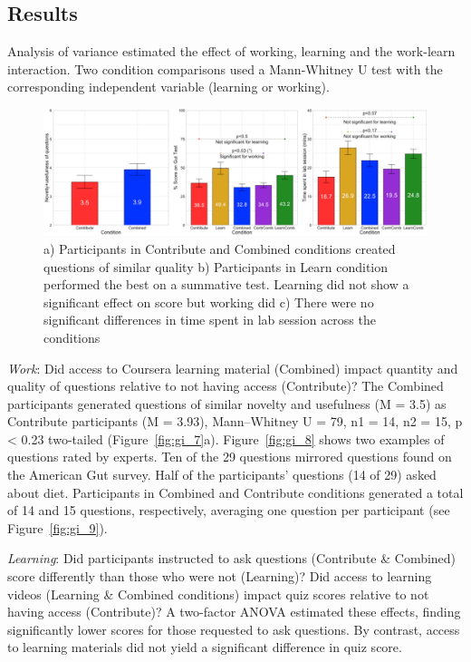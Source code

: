 \subsection*{Results}
Analysis of variance estimated the effect of working, learning and the work-learn interaction. Two condition comparisons used a Mann-Whitney U test with the corresponding independent variable (learning or working). 

\begin{figure}[h] 
  \centering
  \includegraphics[width=1.0\textwidth]{figures/gutinstinct/gi-7.png}
  \caption[Results: Question quality, Learning Score, and Time Spent]
{a) Participants in Contribute and Combined conditions created questions of similar quality b) Participants in Learn condition performed the best on a summative test. Learning did not show a significant effect on score but working did c) There were no significant differences in time spent in lab session across the conditions }
  \label{fig:gi-7}
\end{figure}

\textit{Work}: Did access to Coursera learning material (Combined) impact quantity and quality of questions relative to not having access (Contribute)? The Combined participants generated questions of similar novelty and usefulness (M = 3.5) as Contribute participants (M = 3.93), Mann–Whitney U = 79, n1 = 14, n2 = 15, p < 0.23 two-tailed (Figure~\ref{fig:gi_7}a). Figure~\ref{fig:gi_8} shows two examples of questions rated by experts. Ten of the 29 questions mirrored questions found on the American Gut survey. Half of the participants’ questions (14 of 29) asked about diet. Participants in Combined and Contribute conditions generated a total of 14 and 15 questions, respectively, averaging one question per participant (see Figure~\ref{fig:gi_9}). 

\textit{Learning}: Did participants instructed to ask questions (Contribute \& Combined) score differently than those who were not (Learning)? Did access to learning videos (Learning \& Combined conditions) impact quiz scores relative to not having access (Contribute)? A two-factor ANOVA estimated these effects, finding significantly lower scores for those requested to ask questions. By contrast, access to learning materials did not yield a significant difference in quiz score.

